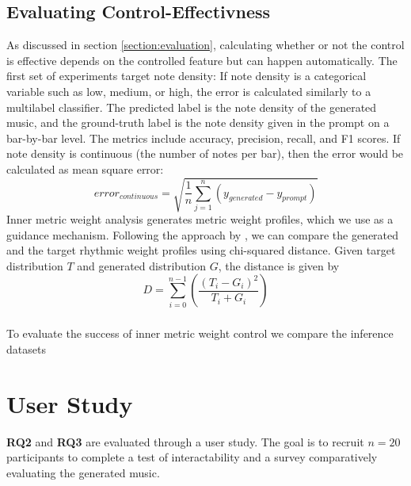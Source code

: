 \subsection{Evaluating Control-Effectivness}
As discussed in section \ref{section:evaluation}, calculating whether or not the control is effective depends on the controlled feature but can happen automatically. 
The first set of experiments target note density: If note density is a categorical variable such as low, medium, or high, the error is calculated similarly to a multilabel classifier. The predicted label is the note density of the generated music, and the ground-truth label is the note density given in the prompt on a bar-by-bar level. 
The metrics include accuracy, precision, recall, and F1 scores. 
If note density is continuous (the number of notes per bar), then the error would be calculated as mean square error: 
\begin{equation}
 error_{continuous} = \sqrt{\frac{1}{n}\sum_{j=1}^{n}(y_{generated}-y_{prompt})}
\end{equation}
Inner metric weight analysis generates metric weight profiles, which we use as a guidance mechanism. Following the approach by \cite{Bemman2024}, we can compare the generated and the target rhythmic weight profiles using chi-squared distance.
Given target distribution $T$ and generated distribution $G$, the distance is given by 
\begin{equation}
D=\sum_{i=0}^{n-1}(\frac{(T_i-G_i)^2}{T_i+G_i})
\end{equation}
\subsubsection{}
To evaluate the success of inner metric weight control we compare the inference datasets 
\section{User Study}
\textbf{RQ2} and \textbf{RQ3} are evaluated through a user study. The goal is to recruit $n=20$ participants to complete a test of interactability and a survey comparatively evaluating the generated music. 
